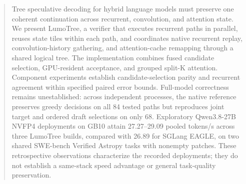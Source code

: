 \begin{abstract}
Tree speculative decoding for hybrid language models must preserve one coherent continuation across recurrent, convolution, and attention state. We present LumoTree, a verifier that executes recurrent paths in parallel, reuses state tiles within each path, and coordinates native recurrent replay, convolution-history gathering, and attention-cache remapping through a shared logical tree. The implementation combines fused candidate selection, GPU-resident acceptance, and grouped split-K attention. Component experiments establish candidate-selection parity and recurrent agreement within specified paired error bounds. Full-model correctness remains unestablished: across independent processes, the native reference preserves greedy decisions on all 84 tested paths but reproduces joint target and ordered draft selections on only 68. Exploratory Qwen3.8-27B NVFP4 deployments on GB10 attain 27.27--29.09 pooled tokens/s across three LumoTree builds, compared with 26.89 for SGLang EAGLE, on two shared SWE-bench Verified Astropy tasks with nonempty patches. These retrospective observations characterize the recorded deployments; they do not establish a same-stack speed advantage or general task-quality preservation.
\end{abstract}
